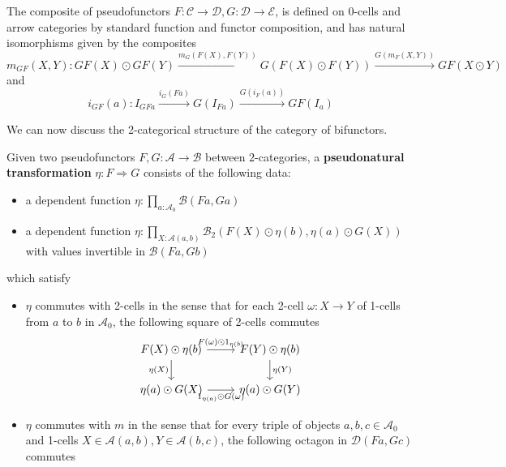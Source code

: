 The composite of pseudofunctors $F:\mathcal{C}\rightarrow\mathcal{D},G:\mathcal{D}\rightarrow \mathcal{E}$, is defined on 0-cells and arrow categories by standard function and functor composition, and has natural isomorphisms given by the composites
\begin{equation*}
    m_{GF}(X,Y):GF(X)\odot GF(Y)\xrightarrow{m_G(F(X),F(Y))} G(F(X)\odot F(Y))\xrightarrow{G(m_F(X,Y))}GF(X\odot Y)
\end{equation*}
and
\begin{equation*}
    i_{GF}(a):I_{GFa}\xrightarrow{i_G(Fa)}G(I_{Fa})\xrightarrow{G(i_F(a))}GF(I_a)
\end{equation*}

We can now discuss the 2-categorical structure of the category of bifunctors.

\begin{defn}{}
    Given two pseudofunctors $F,G:\mathcal{A}\rightarrow \mathcal{B}$ between $2$-categories, a \textbf{pseudonatural transformation} $\eta:F\Rightarrow G$ consists of the following data:
    \begin{itemize}
        \item a dependent function $\eta:\prod_{a :\mathcal{A}_0}\mathcal{B}(Fa,Ga)$
        \item a dependent function $\eta:\prod_{X : \mathcal{A}(a,b)}\mathcal{B}_2(F(X)\odot \eta(b),\eta(a)\odot G(X))$ with values invertible in $\mathcal{B}(Fa,Gb)$
    \end{itemize}
    which satisfy
    \begin{itemize}
        \item $\eta$ commutes with 2-cells in the sense that for each 2-cell $\omega:X\rightarrow Y$ of 1-cells from $a$ to $b$ in $\mathcal{A}_0$, the following square of 2-cells commutes
        \[\begin{tikzcd}
        	{F(X)\odot \eta(b)} & {F(Y)\odot \eta(b)} \\
        	{\eta(a)\odot G(X)} & {\eta(a)\odot G(Y)}
        	\arrow["{F(\omega)\odot1_{\eta(b)}}", from=1-1, to=1-2]
        	\arrow["{\eta(Y)}", from=1-2, to=2-2]
        	\arrow["{\eta(X)}"', from=1-1, to=2-1]
        	\arrow["{1_{\eta(a)}\odot G(\omega)}"', from=2-1, to=2-2]
        \end{tikzcd}\]
        \item $\eta$ commutes with $m$ in the sense that for every triple of objects $a,b,c \in \mathcal{A}_0$ and 1-cells $X \in \mathcal{A}(a,b), Y \in \mathcal{A}(b,c)$, the following octagon in $\mathcal{D}(Fa,Gc)$ commutes

\end{itemize}
\end{defn}
